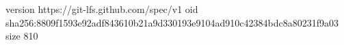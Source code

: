 version https://git-lfs.github.com/spec/v1
oid sha256:8809f1593e92adf843610b21a9d330193e9104ad910c42384bdc8a80231f9a03
size 810
